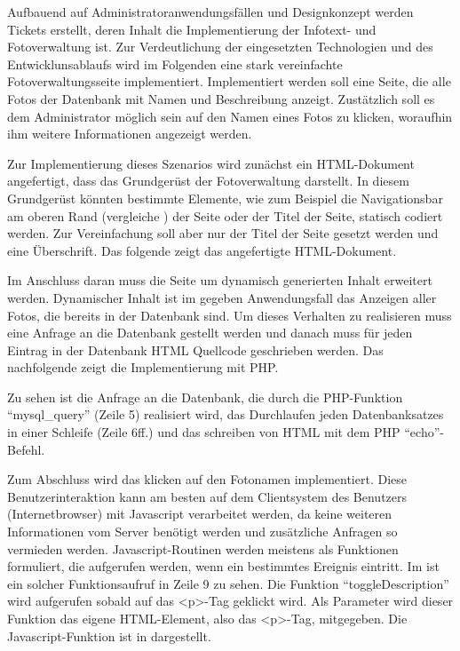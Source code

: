 Aufbauend auf Administratoranwendungsfällen und Designkonzept werden Tickets erstellt, deren Inhalt die Implementierung der Infotext- und Fotoverwaltung ist. Zur Verdeutlichung der eingesetzten Technologien und des Entwicklunsablaufs wird im Folgenden eine stark vereinfachte Fotoverwaltungsseite implementiert. Implementiert werden soll eine Seite, die alle Fotos der Datenbank mit Namen und Beschreibung anzeigt. Zustätzlich soll es dem Administrator möglich sein auf den Namen eines Fotos zu klicken, woraufhin ihm weitere Informationen angezeigt werden.

Zur Implementierung dieses Szenarios wird zunächst ein HTML-Dokument angefertigt, dass das Grundgerüst der Fotoverwaltung darstellt. In diesem Grundgerüst könnten bestimmte Elemente, wie zum Beispiel die Navigationsbar am oberen Rand (vergleiche ) der Seite oder der Titel der Seite, statisch codiert werden. Zur Vereinfachung soll aber nur der Titel der Seite gesetzt werden und eine Überschrift. Das folgende  zeigt das angefertigte HTML-Dokument.



Im Anschluss daran muss die Seite um dynamisch generierten Inhalt erweitert werden. Dynamischer Inhalt ist im gegeben Anwendungsfall das Anzeigen aller Fotos, die bereits in der Datenbank sind. Um dieses Verhalten zu realisieren muss eine Anfrage an die Datenbank gestellt werden und danach muss für jeden Eintrag in der Datenbank HTML Quellcode geschrieben werden. Das nachfolgende  zeigt die Implementierung mit PHP.



Zu sehen ist die Anfrage an die Datenbank, die durch die PHP-Funktion "`mysql\_query"' (Zeile 5) realisiert wird, das Durchlaufen jeden Datenbanksatzes in einer Schleife (Zeile 6ff.) und das schreiben von HTML mit dem PHP "`echo"'-Befehl.

Zum Abschluss wird das klicken auf den Fotonamen implementiert. Diese Benutzerinteraktion kann am besten auf dem Clientsystem des Benutzers (Internetbrowser) mit Javascript verarbeitet werden, da keine weiteren Informationen vom Server benötigt werden und zusätzliche Anfragen so vermieden werden. Javascript-Routinen werden meistens als Funktionen formuliert, die aufgerufen werden, wenn ein bestimmtes Ereignis eintritt. Im  ist ein solcher Funktionsaufruf in Zeile 9 zu sehen. Die Funktion "`toggleDescription"' wird aufgerufen sobald auf das <p>-Tag geklickt wird. Als Parameter wird dieser Funktion das eigene HTML-Element, also das <p>-Tag, mitgegeben. Die Javascript-Funktion ist in  dargestellt.

